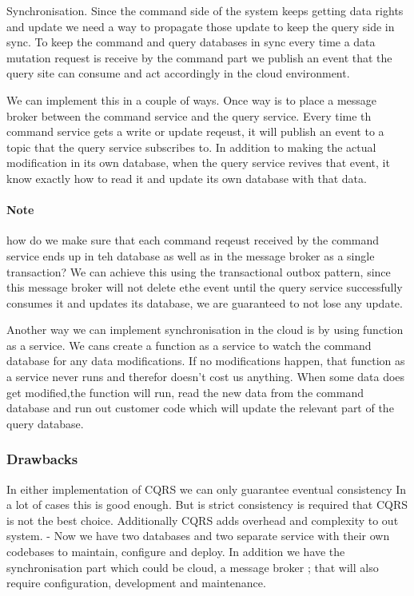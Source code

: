Synchronisation.
Since the command side of the system keeps getting data rights and update we need a way to propagate those update to keep the query side in sync.
To keep the command and query databases in sync every time a data mutation request is receive by the command part we publish an event that the query site can consume and act accordingly in the cloud environment.

We can implement this in a couple of ways.
Once way is to place a message broker between the command service and the query service.
Every time th command service gets a write or update reqeust, it will publish an event to a topic that the query service subscribes to.
In addition to making the actual modification in its own database, when the query service revives that event, it know exactly how to read it and update its own database with that data.

\paragraph{Note}
how do we make sure that each command reqeust received by the command service ends up in teh database as well as in the message broker as a single transaction?
We can achieve this using the transactional outbox pattern, since this message broker will not delete ethe event until the query service successfully consumes it and updates its database, we are guaranteed to not lose any update.

Another way we can implement synchronisation in the cloud is by using function as a service.
We cans create a function as a service to watch the command database for any data modifications.
If no modifications happen, that function as a service never runs and therefor doesn't cost us anything.
When some data does get modified,the function will run, read the new data from the command database and run out customer code which will update the relevant part of the query database.

\subsubsection{Drawbacks}
In either implementation of CQRS we can only guarantee eventual consistency
In a lot of cases this is good enough.
But is strict consistency is required that CQRS is not the best choice.
Additionally CQRS adds overhead and complexity to out system.
- Now we have two databases and two separate service with their own codebases to maintain, configure and deploy.
In addition we have the synchronisation part which could be cloud, a message broker ; that will also require configuration, development and maintenance.

